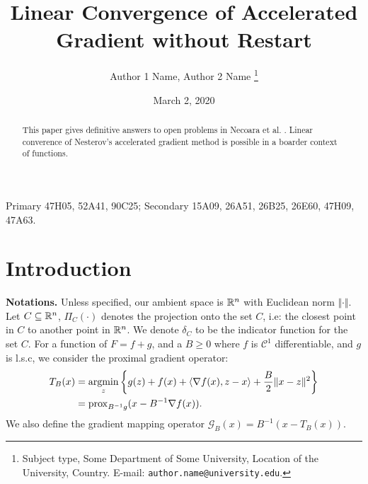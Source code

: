 \documentclass[12pt]{article}
\begin{document}
\newcommand{\dist}{\ensuremath{\operatorname{dist}}}

\title{{\selectfont Linear Convergence of Accelerated Gradient without Restart}}

\author{
    Author 1 Name, Author 2 Name
    \thanks{
        Subject type, Some Department of Some University, Location of the University,
        Country. E-mail: \texttt{author.name@university.edu}.
    }
}

\date{March 2, 2020}

\maketitle
{}

\begin{abstract} 
    This paper gives definitive answers to open problems in Necoara et al. \cite{necoara_linear_2019}. 
    Linear converence of Nesterov's accelerated gradient method is possible in a boarder context of functions. 
\end{abstract}

Primary 47H05, 52A41, 90C25; Secondary 15A09, 26A51, 26B25, 26E60, 47H09, 47A63.


\section{Introduction}
    \textbf{Notations.}
    Unless specified, our ambient space is $\mathbb R^n$ with Euclidean norm $\Vert \cdot\Vert$.
    Let $C\subseteq \mathbb R^n$, $\Pi_C(\cdot)$ denotes the projection onto the set $C$, i.e: the closest point in $C$ to another point in $\mathbb R^n$. 
    We denote $\delta_C$ to be the indicator function for the set $C$. 
    For a function of $F = f + g$, and a $B\ge 0$ where $f$ is $\mathcal C^1$ differentiable, and $g$ is l.s.c, we consider the proximal gradient operator: 
    \begin{align*}
        T_B(x) &= \mathop{\rm argmin}\limits_{z} \left\lbrace
            g(z) + f(x) + \langle \nabla f(x), z - x\rangle + \frac{B}{2}\Vert x - z\Vert^2
        \right\rbrace
        \\
        &= \operatorname{prox}_{B^{-1}g}(x - B^{-1}\nabla f(x)). 
    \end{align*}
    We also define the gradient mapping operator $\mathcal G_B(x) = B^{-1}(x - T_B(x))$. 
\end{document}
